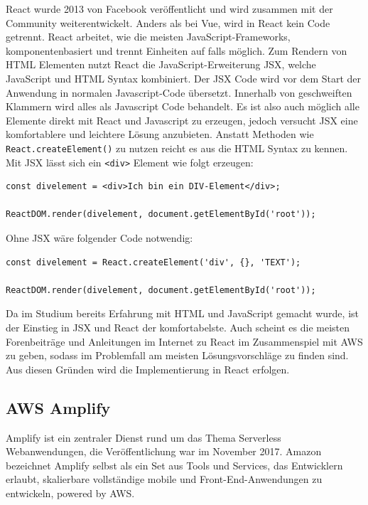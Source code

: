 {React wurde 2013 von Facebook veröffentlicht und wird zusammen mit der Community weiterentwickelt.
Anders als bei Vue, wird in React kein Code getrennt.
React arbeitet, wie die meisten JavaScript-Frameworks, komponentenbasiert und trennt Einheiten auf falls möglich.
Zum Rendern von HTML Elementen nutzt React die JavaScript-Erweiterung JSX, welche JavaScript und HTML Syntax kombiniert.
Der JSX Code wird vor dem Start der Anwendung in normalen Javascript-Code übersetzt.
Innerhalb von geschweiften Klammern wird alles als Javascript Code behandelt.
Es ist also auch möglich alle Elemente direkt mit React und Javascript zu erzeugen, jedoch versucht JSX eine komfortablere und leichtere Lösung anzubieten.
Anstatt Methoden wie \verb+React.createElement()+ zu nutzen reicht es aus die HTML Syntax zu kennen.
Mit JSX lässt sich ein \verb+<div>+ Element wie folgt erzeugen:
\begin{lstlisting}[basicstyle=\ttfamily, breaklines=true , frame = single, backgroundcolor=\color{flashwhite} ]
const divelement = <div>Ich bin ein DIV-Element</div>;

ReactDOM.render(divelement, document.getElementById('root'));
\end{lstlisting}

Ohne JSX wäre folgender Code notwendig:
\begin{lstlisting}[basicstyle=\ttfamily, breaklines=true , frame = single, backgroundcolor=\color{flashwhite} ]
const divelement = React.createElement('div', {}, 'TEXT');

ReactDOM.render(divelement, document.getElementById('root'));
\end{lstlisting}
\cite[]{JSX}

Da im Studium bereits Erfahrung mit HTML und JavaScript gemacht wurde, ist der Einstieg in JSX und React der komfortabelste.
Auch scheint es die meisten Forenbeiträge und Anleitungen im Internet zu React im Zusammenspiel mit AWS zu geben, sodass im Problemfall am meisten Lösungsvorschläge zu finden sind.
Aus diesen Gründen wird die Implementierung in React erfolgen.


\subsection{AWS Amplify}
\label{Amplify}

Amplify ist ein zentraler Dienst rund um das Thema Serverless Webanwendungen, die Veröffentlichung war im November 2017.
Amazon bezeichnet Amplify selbst als {}\glqq ein Set aus Tools und Services, das Entwicklern erlaubt, skalierbare vollständige
mobile und Front-End-Anwendungen zu entwickeln, powered by AWS.\grqq{}\cite[]{AWSAmplify}

}
